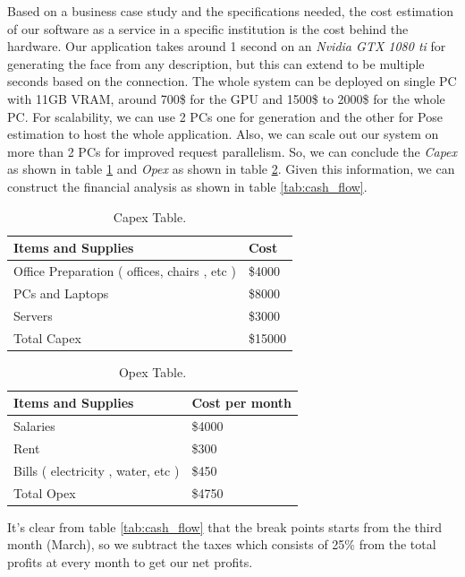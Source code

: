 \newpage

Based on a business case study and the specifications needed, the cost estimation of our software as a service in a specific institution is the cost behind the hardware. Our application takes around 1 second on an \emph{Nvidia GTX 1080 ti} for generating the face from any description, but this can extend to be multiple seconds based on the connection. The whole system can be deployed on single PC with 11GB VRAM, around 700\$ for the GPU and 1500\$ to 2000\$ for the whole PC. For scalability, we can use 2 PCs one for generation and the other for Pose estimation to host the whole application. Also, we can scale out our system on more than 2 PCs for improved request parallelism. So, we can conclude the \emph{Capex} as shown in table \ref{tab:capex} and \emph{Opex} as shown in table \ref{tab:opex}. Given this information, we can construct the financial analysis as shown in table \ref{tab:cash_flow}.

\begin{table}[H]
\centering
\caption{Capex Table.}
\begin{tabular}[t]{| l | l |}
\hline
Items and Supplies & Cost \\
\hline
 Office Preparation ( offices, chairs , etc )&  \$4000  \\
\hline
 PCs and Laptops & \$8000 \\
\hline
Servers & \$3000 \\
\hline
Total Capex & \$15000 \\
\hline
\end{tabular}
\label{tab:capex}
\end{table}

\begin{table}[H]
\centering
\caption{Opex Table.}
\begin{tabular}[t]{| l | l |}
\hline
Items and Supplies & Cost per month \\
\hline
Salaries & \$4000 \\
\hline
Rent & \$300 \\
\hline
Bills ( electricity , water, etc ) & \$450\\
\hline
Total Opex & \$4750 \\
\hline
\end{tabular}
\label{tab:opex}
\end{table}

It's clear from table \ref{tab:cash_flow} that the break points starts from the third month (March), so we subtract the taxes which consists of 25\% from the total profits at every month to get our net profits.  

